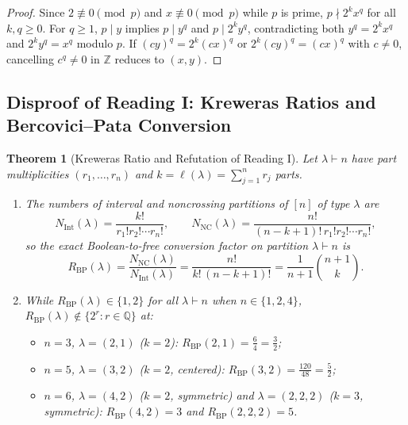 \documentclass[11pt,a4paper]{article}
\newtheorem{theorem}{Theorem}[section]
\theoremstyle{definition}
\theoremstyle{remark}
\newcommand{\NC}{\mathrm{NC}}
\newcommand{\IntP}{\mathrm{Int}}
\begin{document}
\begin{proof}
Since $2 \not\equiv 0 \pmod{p}$ and $x \not\equiv 0 \pmod{p}$ while $p$ is prime, $p \nmid 2^k x^q$ for all $k, q \ge 0$. For $q \ge 1$, $p \mid y$ implies $p \mid y^q$ and $p \mid 2^k y^q$, contradicting both $y^q = 2^k x^q$ and $2^k y^q = x^q$ modulo $p$. If $(c y)^q = 2^k (c x)^q$ or $2^k (c y)^q = (c x)^q$ with $c \ne 0$, cancelling $c^q \ne 0$ in $\mathbb{Z}$ reduces to $(x, y)$.
\end{proof}

\subsection{Disproof of Reading I: Kreweras Ratios and Bercovici--Pata Conversion}

\begin{theorem}[Kreweras Ratio and Refutation of Reading I]\label{thm:reading1}
Let $\lambda \vdash n$ have part multiplicities $(r_1, \dots, r_n)$ and $k = \ell(\lambda) = \sum_{j=1}^n r_j$ parts.
\begin{enumerate}
  \item[(a)] The numbers of interval and noncrossing partitions of $[n]$ of type $\lambda$ are
  \begin{equation}\label{eq:kreweras}
    N_{\IntP}(\lambda) = \frac{k!}{r_1! r_2! \cdots r_n!}, \qquad
    N_{\NC}(\lambda) = \frac{n!}{(n - k + 1)! \, r_1! r_2! \cdots r_n!},
  \end{equation}
  so the exact Boolean-to-free conversion factor on partition $\lambda \vdash n$ is
  \begin{equation}\label{eq:rbp}
    R_{\mathrm{BP}}(\lambda) = \frac{N_{\NC}(\lambda)}{N_{\IntP}(\lambda)} = \frac{n!}{k! \, (n - k + 1)!} = \frac{1}{n+1}\binom{n+1}{k}.
  \end{equation}
  \item[(b)] While $R_{\mathrm{BP}}(\lambda) \in \{1, 2\}$ for all $\lambda \vdash n$ when $n \in \{1, 2, 4\}$, $R_{\mathrm{BP}}(\lambda) \notin \{2^r : r \in \mathbb{Q}\}$ at:
  \begin{itemize}
    \item $n = 3$, $\lambda = (2, 1)$ ($k = 2$): $R_{\mathrm{BP}}(2, 1) = \frac{6}{4} = \frac{3}{2}$;
    \item $n = 5$, $\lambda = (3, 2)$ ($k = 2$, centered): $R_{\mathrm{BP}}(3, 2) = \frac{120}{48} = \frac{5}{2}$;
    \item $n = 6$, $\lambda = (4, 2)$ ($k = 2$, symmetric) and $\lambda = (2, 2, 2)$ ($k = 3$, symmetric): $R_{\mathrm{BP}}(4, 2) = 3$ and $R_{\mathrm{BP}}(2, 2, 2) = 5$.

\end{itemize}
\end{enumerate}
\end{theorem}
\end{document}
